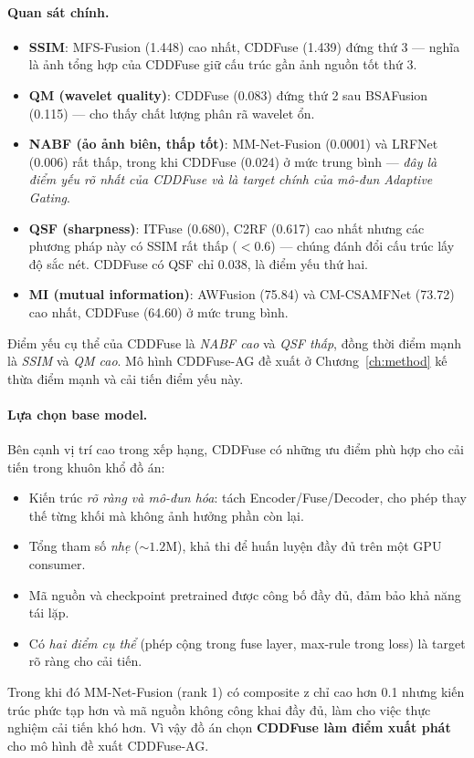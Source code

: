 \paragraph{Quan sát chính.}
\begin{itemize}\itemsep0pt
    \item \textbf{SSIM}: MFS-Fusion (1.448) cao nhất, CDDFuse (1.439) đứng thứ 3 --- nghĩa là ảnh tổng hợp của CDDFuse giữ cấu trúc gần ảnh nguồn tốt thứ 3.
    \item \textbf{QM (wavelet quality)}: CDDFuse (0.083) đứng thứ 2 sau BSAFusion (0.115) --- cho thấy chất lượng phân rã wavelet ổn.
    \item \textbf{NABF (ảo ảnh biên, thấp tốt)}: MM-Net-Fusion (0.0001) và LRFNet (0.006) rất thấp, trong khi CDDFuse (0.024) ở mức trung bình --- \emph{đây là điểm yếu rõ nhất của CDDFuse và là target chính của mô-đun Adaptive Gating}.
    \item \textbf{QSF (sharpness)}: ITFuse (0.680), C2RF (0.617) cao nhất nhưng các phương pháp này có SSIM rất thấp ($<0.6$) --- chúng đánh đổi cấu trúc lấy độ sắc nét. CDDFuse có QSF chỉ 0.038, là điểm yếu thứ hai.
    \item \textbf{MI (mutual information)}: AWFusion (75.84) và CM-CSAMFNet (73.72) cao nhất, CDDFuse (64.60) ở mức trung bình.
\end{itemize}

Điểm yếu cụ thể của CDDFuse là \emph{NABF cao} và \emph{QSF thấp}, đồng thời điểm mạnh là \emph{SSIM} và \emph{QM cao}. Mô hình CDDFuse-AG đề xuất ở Chương~\ref{ch:method} kế thừa điểm mạnh và cải tiến điểm yếu này.

\paragraph{Lựa chọn base model.}
Bên cạnh vị trí cao trong xếp hạng, CDDFuse có những ưu điểm phù hợp cho cải tiến trong khuôn khổ đồ án:
\begin{itemize}\itemsep0pt
    \item Kiến trúc \emph{rõ ràng và mô-đun hóa}: tách Encoder/Fuse/Decoder, cho phép thay thế từng khối mà không ảnh hưởng phần còn lại.
    \item Tổng tham số \emph{nhẹ} ($\sim 1.2$M), khả thi để huấn luyện đầy đủ trên một GPU consumer.
    \item Mã nguồn và checkpoint pretrained được công bố đầy đủ, đảm bảo khả năng tái lặp.
    \item Có \emph{hai điểm cụ thể} (phép cộng trong fuse layer, max-rule trong loss) là target rõ ràng cho cải tiến.
\end{itemize}
Trong khi đó MM-Net-Fusion (rank 1) có composite z chỉ cao hơn 0.1 nhưng kiến trúc phức tạp hơn và mã nguồn không công khai đầy đủ, làm cho việc thực nghiệm cải tiến khó hơn. Vì vậy đồ án chọn \textbf{CDDFuse làm điểm xuất phát} cho mô hình đề xuất CDDFuse-AG.


